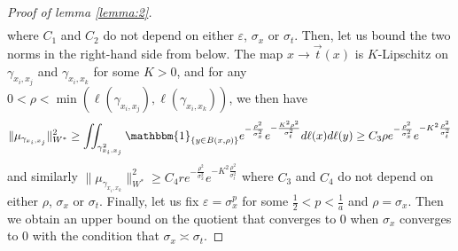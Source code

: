 \documentclass[pdflatex,sn-mathphys-num]{sn-jnl}%
\theoremstyle{thmstyleone}%
\theoremstyle{thmstyletwo}%
\theoremstyle{thmstylethree}%
\begin{document}
\begin{appendices}
\begin{proof}[Proof of lemma \ref{lemma:2}]
\begin{align*}
\end{align*}
where $C_1$ and $C_2$ do not depend on either $\varepsilon$, $\sigma_x$ or $\sigma_t$.
\medbreak
Then, let us bound the two norms in the right-hand side from below. The map $x \to \vec{t}(x)$ is $K$-Lipschitz on $\gamma_{x_i, x_j}$ and $\gamma_{x_i, x_k}$ for some $K>0$, and for any $0 < \rho < \min(\ell(\gamma_{x_i, x_j}), \ell(\gamma_{x_i, x_k}))$, we then have
\begin{equation*}
    \|\mu_{\gamma_{x_i, x_j}}\|_{W^\ast}^2 \geq \iint_{\gamma_{x_i, x_j}^2}\mathbbm{1}_{\{y\in B(x, \rho)\}}e^{-\frac{\rho^2}{\sigma_x^2}}e^{-\frac{K^2\rho^2}{\sigma_t^2}}d\ell(x)d\ell(y)\geq C_3\rho e^{-\frac{\rho^2}{\sigma_x^2}}e^{-K^2\frac{\rho^2}{\sigma_t^2}}
\end{equation*}
and similarly $\|\mu_{\gamma_{x_i, x_k}}\|_{W^\ast}^2 \geq C_4re^{-\frac{\rho^2}{\sigma_x^2}}e^{-K^2\frac{\rho^2}{\sigma_t^2}}$ where $C_3$ and $C_4$ do not depend on either $\rho$, $\sigma_x$ or $\sigma_t$.
\medbreak
Finally, let us fix $\varepsilon=\sigma_x^p$ for some $\frac{1}{2} < p < \frac{1}{a}$ and $\rho=\sigma_x$. Then we obtain an upper bound on the quotient that converges to $0$ when $\sigma_x$ converges to $0$ with the condition that $\sigma_x \asymp \sigma_t$. \qedsymbol
\end{proof}




\end{appendices}


\end{document}
